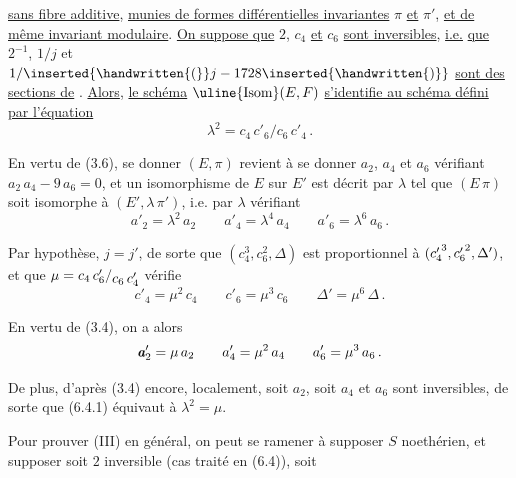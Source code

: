 %
\space
\uline{sans fibre additive}, \uline{munies de formes différentielles invariantes} $\pi$ \uline{et} $\pi'$, \uline{et de même invariant modulaire}. \uline{On suppose que} $2$, $c_4$ \uline{et} $c_6$ \uline{sont inversibles}, \uline{i.e.} \uline{que} $2^{-1}$, $1/j$ et $1/\inserted{\handwritten{(}}j-1728\inserted{\handwritten{)}}$ \uline{sont des sections de} \reversemarginpar{}\normalmarginpar. \uline{Alors}, \uline{le schéma} $\text{\uline{Isom}}(E,F)$ \uline{s'identifie au schéma défini par l'équation}
\[
\lambda^2=c_4\,c'_6/c_6\,c'_4 \, .
\]

En vertu de (3.6), se donner $(E,\pi)$ revient à se donner $a_2$, $a_4$ et $a_6$ vérifiant $a_2\,a_4-9\,a_6=0$, et un isomorphisme de $E$ sur $E'$ est décrit par $\lambda$ tel que $(E\,\pi)$ soit isomorphe à $(E',\lambda\,\pi')$, i.e. par $\lambda$ vérifiant
\[
a'_2=\lambda^2\,a_2 \qquad a'_4=\lambda^4\,a_4 \qquad a'_6=\lambda^6\,a_6 \, . \tag*{(6.4.1)}
\]

Par hypothèse, $j=j'$, de sorte que $(c_4^3,c_6^2,\Delta)$ est proportionnel à $(c_4^{\raisebox{-.38ex}{$\scriptstyle\prime$}\,3},c_6^{\raisebox{-.38ex}{$\scriptstyle\prime$}\,2},\Delta')$, et que $\mu=c_4\,c'_6/\raisebox{-.52ex}{$c_6\,c'_4$}$ vérifie
\[
c'_4=\mu^2\,c_4 \qquad c'_6=\mu^3\,c_6 \qquad \Delta'=\mu^6\,\Delta \, . \tag*{(6.4.2)}
\]

En vertu de (3.4), on a alors
\[
{\mathbb{\text{\makebox[0pt][l]{\kern.45pt$a$}$a$}}}'_2=\mu\,a_2 \qquad a'_4=\mu^2\,a_4 \qquad a'_6=\mu^3\,a_6 \, .
\]

De plus, d'après (3.4) encore, localement, soit $a_2$, soit $a_4$ et $a_6$ sont inversibles, de sorte que (6.4.1) équivaut à $\lambda^2=\mu$.

Pour prouver (III) en général, on peut se ramener à supposer $S$ noethérien, et supposer soit $2$ inversible (cas traité en (6.4)), soit%

